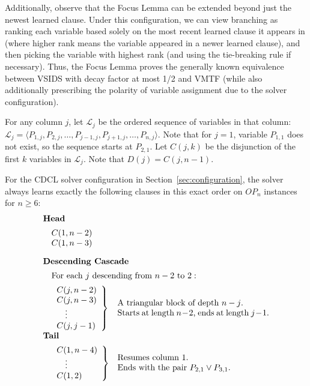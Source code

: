 \documentclass[a4paper,UKenglish,cleveref, autoref, thm-restate]{lipics-v2021}
\begin{document}
Additionally, observe that the Focus Lemma can be extended beyond just the newest learned clause. Under this configuration, we can view branching as ranking each variable based solely on the most recent learned clause it appears in (where higher rank means the variable appeared in a newer learned clause), and then picking the variable with highest rank (and using the tie-breaking rule if necessary). Thus, the Focus Lemma proves the generally known equivalence between VSIDS with decay factor at most 1/2 and VMTF (while also additionally prescribing the polarity of variable assignment due to the solver configuration).  

\begin{definition}
For any column $j$, let $\mathcal{L}_j$ be the ordered sequence of variables in that column: $\mathcal{L}_j = \langle P_{1,j}, P_{2,j}, \dots, P_{j-1,j}, P_{j+1,j}, \dots, P_{n, j} \rangle$. Note that for $j=1$, variable $P_{1,1}$ does not exist, so the sequence starts at $P_{2,1}$. Let $C(j, k)$ be the disjunction of the first $k$ variables in $\mathcal{L}_j$. Note that $D(j) = C(j, n - 1)$.
\end{definition}

\begin{theorem}
\label{theorem:clause_structure}
For the CDCL solver configuration in Section~\ref{sec:configuration}, the solver always learns exactly the following clauses in this exact order on $OP_n$ instances for $n \geq 6$:
$$
\begin{array}{rll}
\multicolumn{3}{l}{\textbf{Head}} \\[.5em]
& C(1, n-2)  \\
& C(1, n-3) \\[1em]

\multicolumn{3}{l}{\textbf{Descending Cascade}} \\[.5em]
& \multicolumn{2}{l}{\text{For each } j \text{ descending from } n-2 \text{ to } 2:} \\[0.5em]
& \left.
    \begin{array}{l}
    C(j, n-2) \\
    C(j, n-3) \\
    \quad \vdots \\
    C(j, j-1)
    \end{array}
  \right\} & \parbox{18em}{A triangular block of depth $n-j$. \\ Starts at length $n - 2$, ends at length $j-1$.} \\[1em]

\multicolumn{3}{l}{\textbf{Tail}} \\[.5em]
& \left.
    \begin{array}{l}
    C(1, n-4) \\
    \quad \vdots \\
    C(1, 2)
    \end{array}
  \right\} & \parbox{18em}{Resumes column 1. \\ Ends with the pair $P_{2,1} \vee P_{3,1}$.}
\end{array}
$$
\end{theorem}
\end{document}
